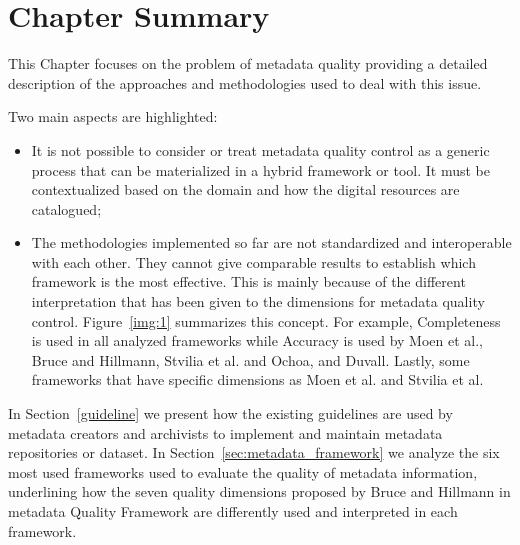 \documentclass[epsfig,a4paper,12pt,titlepage]{book}
\begin{document}
\section{Chapter Summary}

This Chapter focuses on the problem of metadata quality providing a detailed description of the approaches and methodologies used to deal with this issue. 

Two main aspects are highlighted:

\begin{itemize}
    \item It is not possible to consider or treat metadata quality control as a generic process that can be materialized in a hybrid framework or tool. It must be contextualized based on the domain and how the digital resources are catalogued;
\item The methodologies implemented so far are not standardized and interoperable with each other. They cannot give comparable results to establish which framework is the most effective. This is mainly because of the different interpretation that has been given to the dimensions for metadata quality control. Figure~\ref{img:1} summarizes this concept. For example, Completeness is used in all analyzed frameworks while Accuracy is used by Moen et al., Bruce and Hillmann, Stvilia et al. and Ochoa, and Duvall. Lastly, some frameworks that have specific dimensions as Moen et al. and Stvilia et al.
\end{itemize}

In Section~\ref{guideline} we present how the existing guidelines are used by metadata creators and archivists to implement and maintain metadata repositories or dataset. In Section~\ref{sec:metadata_framework} we analyze the six most used frameworks used to evaluate the quality of metadata information,  underlining how the seven quality dimensions proposed by Bruce and Hillmann in metadata Quality Framework are differently used and interpreted in each framework. 
\end{document}

